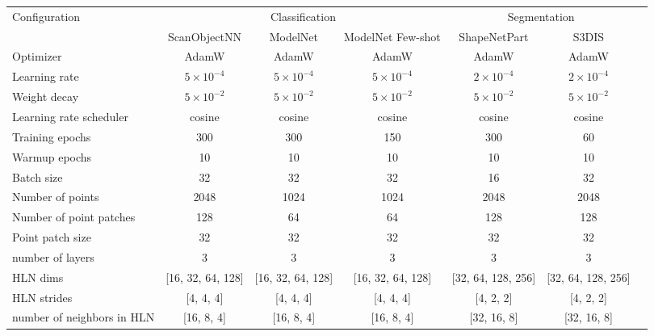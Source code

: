 \begin{table*}
\footnotesize
\setlength{\tabcolsep}{3.3mm}
\begin{tabular}{lcccccc}
\toprule
    \multirow{2}{*}{Configuration}  &\multicolumn{3}{c}{Classification} & \multicolumn{2}{c}{Segmentation}\\
		\cmidrule(r){2-4} \cmidrule(r){5-6}
	 &ScanObjectNN & ModelNet & ModelNet Few-shot & ShapeNetPart & S3DIS     \\
    \midrule
 Optimizer & AdamW & AdamW & AdamW & AdamW & AdamW \\
 Learning rate & $5 \times 10^{-4}$ & $5 \times 10^{-4}$ & $5 \times 10^{-4}$  & $2 \times 10^{-4}$ & $2 \times 10^{-4}$ \\
 Weight decay & $5 \times 10^{-2}$ & $5 \times 10^{-2}$ & $5 \times 10^{-2}$ & $5 \times 10^{-2}$  & $5 \times 10^{-2}$ \\
 Learning rate scheduler & cosine & cosine & cosine & cosine & cosine \\
 Training epochs  & 300 & 300 & 150 & 300 & 60 \\
 Warmup epochs& 10 & 10& 10 & 10 &10 \\
 Batch size & 32 & 32& 32 & 16 & 32 \\
 \midrule
 Number of points  & 2048 & 1024& 1024 & 2048 & 2048 \\
 Number of point patches & 128 & 64 & 64 & 128 & 128\\
 Point patch size  & 32 & 32 & 32  & 32 & 32 \\
 \midrule
 number of layers & 3 & 3 & 3 & 3 & 3\\
 HLN dims & [16, 32, 64, 128] & [16, 32, 64, 128] & [16, 32, 64, 128] & [32, 64, 128, 256] & [32, 64, 128, 256]\\
 HLN strides & [4, 4, 4] & [4, 4, 4] & [4, 4, 4] & [4, 2, 2] & [4, 2, 2]\\
 number of neighbors in HLN & [16, 8, 4] & [16, 8, 4] & [16, 8, 4] & [32, 16, 8] & [32, 16, 8] \\
\bottomrule
\end{tabular}
\label{tab:paramas}
\end{table*}